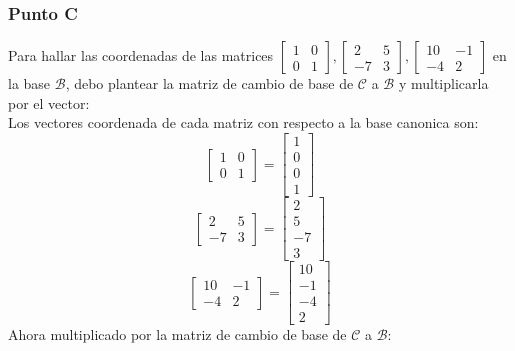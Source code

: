 \documentclass[a4paper,12pt]{article}
\begin{document}
\subsubsection{Punto C}
Para hallar las coordenadas de las matrices $\begin{bmatrix} 1 & 0 \\ 0 & 1 \end{bmatrix}, \begin{bmatrix} 2 & 5 \\ -7 & 3 \end{bmatrix}, \begin{bmatrix} 10 & -1 \\ -4 & 2 \end{bmatrix}$ en la base $\mathcal{B}$, debo plantear la matriz de cambio de base de $\mathcal{C}$ a $\mathcal{B}$ y multiplicarla por el vector: \\
Los vectores coordenada de cada matriz con respecto a la base canonica son:
$$
\begin{bmatrix} 1 & 0 \\ 0 & 1 \end{bmatrix} = \begin{bmatrix} 1 \\ 0 \\ 0 \\ 1 \end{bmatrix}
$$
$$
\begin{bmatrix} 2 & 5 \\ -7 & 3 \end{bmatrix} = \begin{bmatrix} 2 \\ 5 \\ -7 \\ 3 \end{bmatrix}
$$
$$
\begin{bmatrix} 10 & -1 \\ -4 & 2 \end{bmatrix} = \begin{bmatrix} 10 \\ -1 \\ -4 \\ 2 \end{bmatrix}
$$
Ahora multiplicado por la matriz de cambio de base de $\mathcal{C}$ a $\mathcal{B}$:
\end{document}
